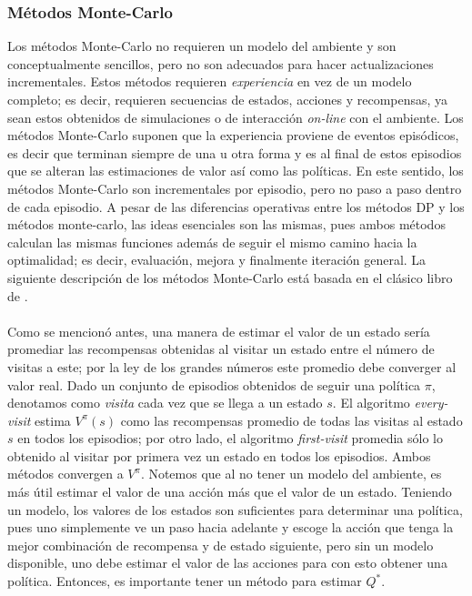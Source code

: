 \documentclass[11pt]{article}
\theoremstyle{plain}
\begin{document}
\subsubsection{Métodos Monte-Carlo} 
Los métodos Monte-Carlo no requieren un modelo del ambiente y son conceptualmente sencillos, pero no son adecuados para hacer actualizaciones incrementales. Estos métodos requieren \textit{experiencia} en vez de un modelo completo; es decir, requieren secuencias de estados, acciones y recompensas, ya sean estos obtenidos de simulaciones o de interacción \textit{on-line} con el ambiente. Los métodos Monte-Carlo suponen que la experiencia proviene de eventos episódicos, es decir que terminan siempre de una u otra forma y es al final de estos episodios que se alteran las estimaciones de valor así como las políticas. En este sentido, los métodos Monte-Carlo son incrementales por episodio, pero no paso a paso dentro de cada episodio. A pesar de las diferencias operativas entre los métodos DP y los métodos monte-carlo, las ideas esenciales son las mismas, pues ambos métodos calculan las mismas funciones además de seguir el mismo camino hacia la optimalidad; es decir, evaluación, mejora y finalmente iteración general. La siguiente descripción de los métodos Monte-Carlo está basada en el clásico libro de \cite{sutton1998reinforcement}.\\
\\
Como se mencionó antes, una manera de estimar el valor de un estado sería promediar las recompensas obtenidas al visitar un estado entre el número de visitas a este; por la ley de los grandes números este promedio debe converger al valor real. Dado un conjunto de episodios obtenidos de seguir una política $\pi$, denotamos como \textit{visita} cada vez que se llega a un estado $s$. El algoritmo \textit{every-visit} estima $V^\pi (s)$ como las recompensas promedio de todas las visitas al estado $s$ en todos los episodios; por otro lado, el algoritmo \textit{first-visit} promedia sólo lo obtenido al visitar por primera vez un estado en todos los episodios. Ambos métodos convergen a $V^\pi$. Notemos que al no tener un modelo del ambiente, es más útil estimar el valor de una acción más que el valor de un estado. Teniendo un modelo, los valores de los estados son suficientes para determinar una política, pues uno simplemente ve un paso hacia adelante y escoge la acción que tenga la mejor combinación de recompensa y de estado siguiente, pero sin un modelo disponible, uno debe estimar el valor de las acciones para con esto obtener una política. Entonces, es importante tener un método para estimar $Q^\ast$.\\
\end{document}
